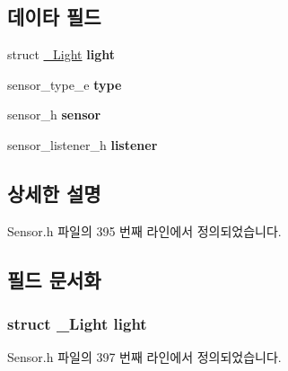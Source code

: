 \subsection*{데이타 필드}
\begin{DoxyCompactItemize}
\item 
\hypertarget{struct___light_extend_ac99fe442698fe6dee34b12dae4f856b3}{struct \hyperlink{struct___light}{\-\_\-\-Light} {\bfseries light}}\label{struct___light_extend_ac99fe442698fe6dee34b12dae4f856b3}

\item 
\hypertarget{struct___light_extend_abffb09766da2fc510a79bb51f82a36e1}{sensor\-\_\-type\-\_\-e {\bfseries type}}\label{struct___light_extend_abffb09766da2fc510a79bb51f82a36e1}

\item 
\hypertarget{struct___light_extend_a5bae9b7801bc3808411925cde81d3f26}{sensor\-\_\-h {\bfseries sensor}}\label{struct___light_extend_a5bae9b7801bc3808411925cde81d3f26}

\item 
\hypertarget{struct___light_extend_aa977dfb866b24fd7d9a20a9a01b2fd1f}{sensor\-\_\-listener\-\_\-h {\bfseries listener}}\label{struct___light_extend_aa977dfb866b24fd7d9a20a9a01b2fd1f}

\end{DoxyCompactItemize}


\subsection{상세한 설명}


Sensor.\-h 파일의 395 번째 라인에서 정의되었습니다.



\subsection{필드 문서화}
\hypertarget{struct___light_extend_ac99fe442698fe6dee34b12dae4f856b3}{
\subsubsection[{light}]{\setlength{\rightskip}{0pt plus 5cm}struct {\bf \-\_\-\-Light} light}}\label{struct___light_extend_ac99fe442698fe6dee34b12dae4f856b3}


Sensor.\-h 파일의 397 번째 라인에서 정의되었습니다.

